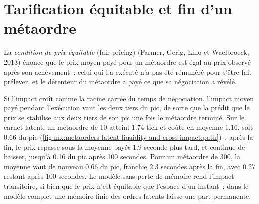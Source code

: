 \begin{omfigure}

\label{fig:mx:metaorders-latent-liquidity-and-cross-impact:scan}
\end{omfigure}

\section{Tarification équitable et fin d'un métaordre}

\begin{definition}\label{def:mx:metaorders-latent-liquidity-and-cross-impact:fair}
La \emph{condition de prix équitable} (fair pricing) (Farmer, Gerig, Lillo et Waelbroeck, 2013) énonce que le prix moyen payé pour un
métaordre est égal au prix observé après son achèvement~: celui qui l'a exécuté n'a pas été rémunéré pour s'être fait prélever, et le détenteur du métaordre a payé ce que sa
négociation a révélé.
\end{definition}

Si l'impact croît comme la racine carrée du temps de négociation, l'impact moyen payé pendant l'exécution vaut les deux tiers du pic, de sorte que la  prédit
que le prix se stabilise aux deux tiers de son pic une fois le métaordre terminé. Sur le carnet latent, un métaordre de 10 atteint 1.74 tick et coûte en moyenne 1.16,
soit 0.66 du pic (\cref{fig:mx:metaorders-latent-liquidity-and-cross-impact:path})~; après la fin, le prix repasse sous la moyenne payée 1.9 seconde
plus tard, et continue de baisser, jusqu'à 0.16 du pic après 100 secondes. Pour un métaordre de 300, la moyenne vaut de nouveau 0.66 du pic, franchie 2.3 secondes après
la fin, avec 0.27 restant après 100 secondes. Le modèle sans perte de mémoire rend l'impact transitoire, si bien que le prix n'est équitable que l'espace d'un instant~; dans le modèle complet
une mémoire finie des ordres latents laisse une part permanente.

